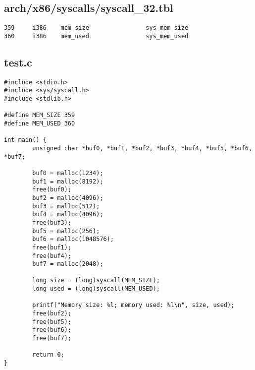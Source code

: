 \documentclass[letterpaper,10pt,titlepage,draftclsnofoot,onecolumn]{article}
\begin{document}
\subsection*{arch/x86/syscalls/syscall\_32.tbl}
\begin{lstlisting}
359     i386    mem_size                sys_mem_size
360     i386    mem_used                sys_mem_used
\end{lstlisting}

\subsection*{test.c}
\begin{lstlisting}
#include <stdio.h>
#include <sys/syscall.h>
#include <stdlib.h>

#define MEM_SIZE 359
#define MEM_USED 360

int main() {
        unsigned char *buf0, *buf1, *buf2, *buf3, *buf4, *buf5, *buf6, *buf7;

        buf0 = malloc(1234);
        buf1 = malloc(8192);
        free(buf0);
        buf2 = malloc(4096);
        buf3 = malloc(512);
        buf4 = malloc(4096);
        free(buf3);
        buf5 = malloc(256);
        buf6 = malloc(1048576);
        free(buf1);
        free(buf4);
        buf7 = malloc(2048);

        long size = (long)syscall(MEM_SIZE);
        long used = (long)syscall(MEM_USED);

        printf("Memory size: %l; memory used: %l\n", size, used);
        free(buf2);
        free(buf5);
        free(buf6);
        free(buf7);

        return 0;
}
\end{lstlisting}
\end{document}
